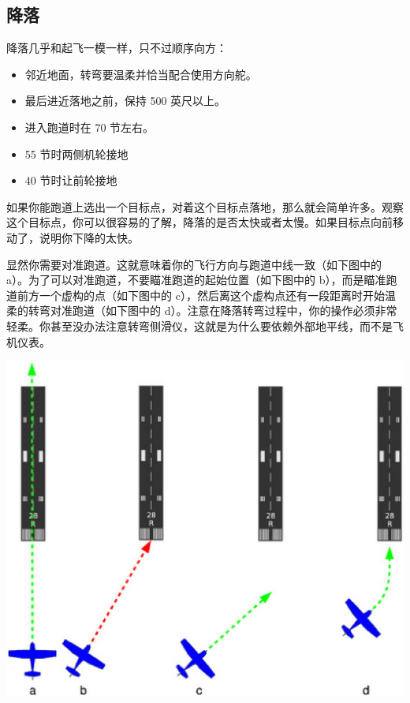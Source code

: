 \subsection{降落}
\label{sec:Ladowanie}

降落几乎和起飞一模一样，只不过顺序向方：

\begin{itemize}
    \item 邻近地面，转弯要温柔并恰当配合使用方向舵。
    \item 最后进近落地之前，保持 500 英尺以上。
    \item 进入跑道时在 70 节左右。
    \item 55 节时两侧机轮接地
    \item 40 节时让前轮接地
\end{itemize}

如果你能跑道上选出一个目标点，对着这个目标点落地，那么就会简单许多。观察这个目标点，你可以很容易的了解，降落的是否太快或者太慢。如果目标点向前移动了，说明你下降的太快。

显然你需要对准跑道。这就意味着你的飞行方向与跑道中线一致（如下图中的 a）。为了可以对准跑道，不要瞄准跑道的起始位置（如下图中的 b），而是瞄准跑道前方一个虚构的点（如下图中的 c），然后离这个虚构点还有一段距离时开始温柔的转弯对准跑道（如下图中的 d）。注意在降落转弯过程中，你的操作必须非常轻柔。你甚至没办法注意转弯侧滑仪，这就是为什么要依赖外部地平线，而不是飞机仪表。

\begin{center}
\includegraphics[width=1.0\textwidth]{img/tut_41}
\end{center}


